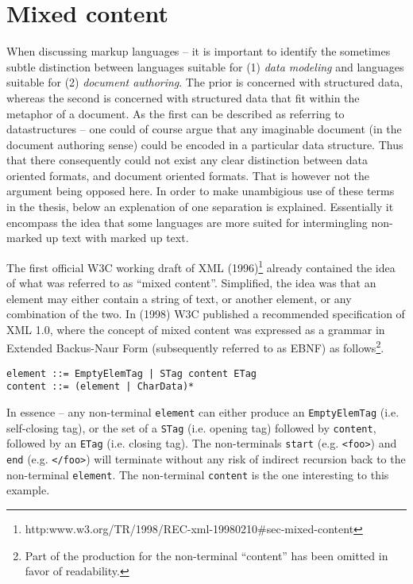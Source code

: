 \documentclass{scrreprt}
\begin{document}
\section{Mixed content}
\label{sec:mixed-content}
When discussing markup languages -- it is important to identify the sometimes subtle distinction between languages suitable for (1) \emph{data modeling} and languages suitable for (2) \emph{document authoring}. The prior is concerned with structured data, whereas the second is concerned with structured data that fit within the metaphor  of a document. As the first can be described as referring to datastructures -- one could of course argue that any imaginable document (in the document authoring sense) could be encoded in a particular data structure. Thus that there consequently could not exist any clear distinction between data oriented formats, and document oriented formats. That is however not the argument being opposed here. In order to make unambigious use of these terms in the thesis, below an explenation of one separation is explained. Essentially it encompass the idea that some languages are more suited for intermingling non-marked up text with marked up text.


The first official W3C working draft of XML (1996)\footnote{http:\/\/www.w3.org/TR/1998/REC-xml-19980210\#sec-mixed-content} already contained the idea of what was referred to as ``mixed content''. Simplified, the idea was that an element may either contain a string of text, or another element, or any combination of the two. In (1998) W3C published a recommended specification of XML 1.0, where the concept of mixed content was expressed as a grammar in Extended Backus-Naur Form (subsequently referred to as EBNF) as follows\footnote{Part of the production for the non-terminal ``content'' has been omitted in favor of readability.}.

\begin{lstlisting}
element ::= EmptyElemTag | STag content ETag 
content ::= (element | CharData)*
\end{lstlisting}

In essence -- any non-terminal \texttt{element} can either produce an \texttt{EmptyElemTag} (i.e. self-closing tag), or the set of a \texttt{STag} (i.e. opening tag) followed by \texttt{content}, followed by an \texttt{ETag} (i.e. closing tag). The non-terminals \texttt{start} (e.g. \texttt{<foo>}) and \texttt{end} (e.g. \texttt{</foo>}) will terminate without any risk of indirect recursion back to the non-terminal \texttt{element}. The non-terminal \texttt{content} is the one interesting to this example.
\end{document}

